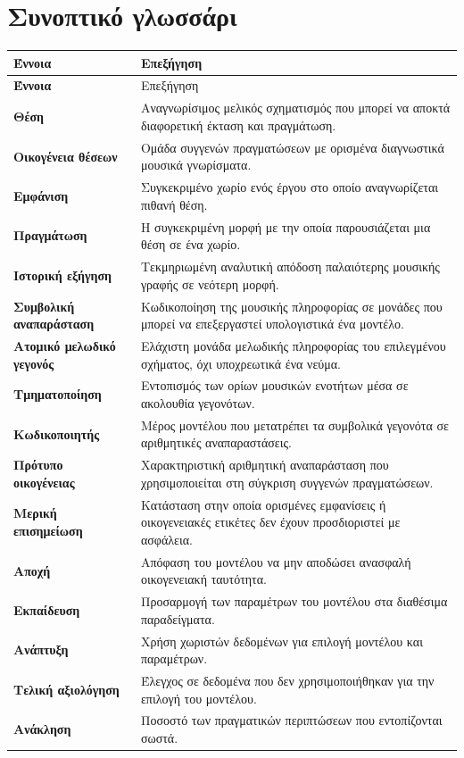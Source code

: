 \documentclass[11pt,a4paper]{extarticle}
\begin{document}
\section{Συνοπτικό γλωσσάρι}
\small
\begin{longtable}{>{\bfseries}p{4.0cm}p{10.7cm}}
\toprule
Έννοια & Επεξήγηση \\
\midrule
\endfirsthead
\toprule Έννοια & Επεξήγηση \\ \midrule
\endhead
Θέση & Αναγνωρίσιμος μελικός σχηματισμός που μπορεί να αποκτά διαφορετική έκταση και πραγμάτωση. \\
Οικογένεια θέσεων & Ομάδα συγγενών πραγματώσεων με ορισμένα διαγνωστικά μουσικά γνωρίσματα. \\
Εμφάνιση & Συγκεκριμένο χωρίο ενός έργου στο οποίο αναγνωρίζεται πιθανή θέση. \\
Πραγμάτωση & Η συγκεκριμένη μορφή με την οποία παρουσιάζεται μια θέση σε ένα χωρίο. \\
Ιστορική εξήγηση & Τεκμηριωμένη αναλυτική απόδοση παλαιότερης μουσικής γραφής σε νεότερη μορφή. \\
Συμβολική αναπαράσταση & Κωδικοποίηση της μουσικής πληροφορίας σε μονάδες που μπορεί να επεξεργαστεί υπολογιστικά ένα μοντέλο. \\
Ατομικό μελωδικό γεγονός & Ελάχιστη μονάδα μελωδικής πληροφορίας του επιλεγμένου σχήματος, όχι υποχρεωτικά ένα νεύμα. \\
Τμηματοποίηση & Εντοπισμός των ορίων μουσικών ενοτήτων μέσα σε ακολουθία γεγονότων. \\
Κωδικοποιητής & Μέρος μοντέλου που μετατρέπει τα συμβολικά γεγονότα σε αριθμητικές αναπαραστάσεις. \\
Πρότυπο οικογένειας & Χαρακτηριστική αριθμητική αναπαράσταση που χρησιμοποιείται στη σύγκριση συγγενών πραγματώσεων. \\
Μερική επισημείωση & Κατάσταση στην οποία ορισμένες εμφανίσεις ή οικογενειακές ετικέτες δεν έχουν προσδιοριστεί με ασφάλεια. \\
Αποχή & Απόφαση του μοντέλου να μην αποδώσει ανασφαλή οικογενειακή ταυτότητα. \\
Εκπαίδευση & Προσαρμογή των παραμέτρων του μοντέλου στα διαθέσιμα παραδείγματα. \\
Ανάπτυξη & Χρήση χωριστών δεδομένων για επιλογή μοντέλου και παραμέτρων. \\
Τελική αξιολόγηση & Έλεγχος σε δεδομένα που δεν χρησιμοποιήθηκαν για την επιλογή του μοντέλου. \\
Ανάκληση & Ποσοστό των πραγματικών περιπτώσεων που εντοπίζονται σωστά. \\

\end{longtable}
\end{document}
